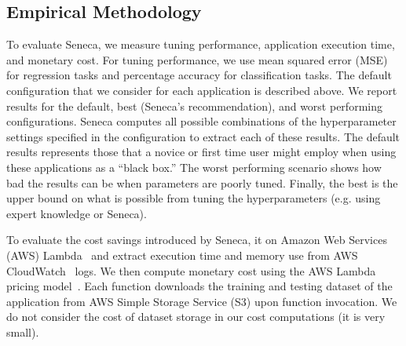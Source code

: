 


\subsection{Empirical Methodology}

To evaluate Seneca, we measure tuning performance, application execution time,
and monetary cost.  For tuning performance, we use mean squared error (MSE)
for regression tasks and percentage accuracy for classification tasks. The
default configuration that we consider for each application is described
above.  We report results for the default, best (Seneca's recommendation), and
worst performing configurations.  Seneca computes all possible combinations of
the hyperparameter settings specified in the configuration to extract each of
these results.  The default results represents those that a novice or first
time user might employ when using these applications as a ``black box.''  The
worst performing scenario shows how bad the results can be when parameters are
poorly tuned.  Finally, the best is the upper bound on what is possible from
tuning the hyperparameters (e.g. using expert knowledge or Seneca). 

To evaluate the cost savings introduced by Seneca,
it on Amazon Web Services (AWS) Lambda~\cite{XXXaws-lambdaXXX} and extract
execution time and memory use from AWS CloudWatch~\cite{XXXcloudwatchCXXX} logs.  
We then compute monetary cost
using the AWS Lambda pricing model~\cite{ref:pricing}.
Each function downloads the training and testing dataset 
of the application from AWS Simple Storage Service (S3) upon function invocation. 
We do not consider the cost of dataset storage in our cost computations (it is very small).

